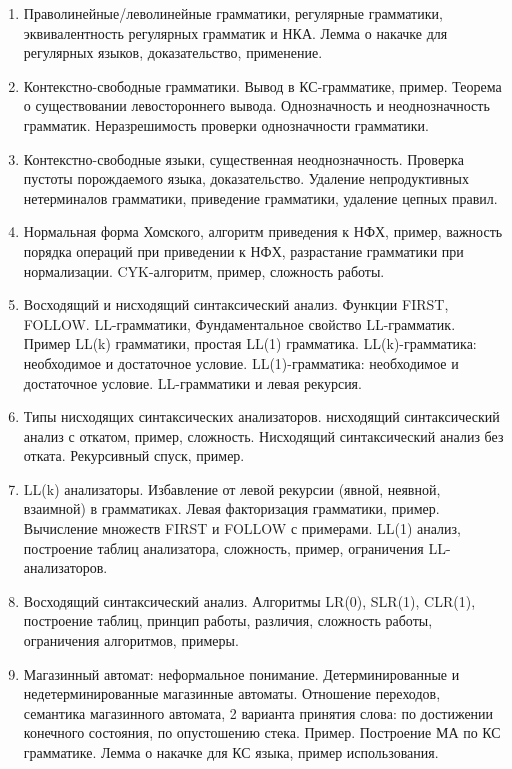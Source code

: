 \documentclass[12pt]{article}
\begin{document}
\begin{enumerate}
  \item {Праволинейные/леволинейные грамматики, регулярные грамматики, эквивалентность регулярных грамматик и НКА. Лемма о накачке для регулярных языков, доказательство, применение. }
  \item {Контекстно-свободные грамматики. Вывод в КС-грамматике, пример. Теорема о существовании левостороннего вывода. Однозначность и неоднозначность грамматик. Неразрешимость проверки однозначности грамматики. }
  \item {Контекстно-свободные языки, существенная неоднозначность. Проверка пустоты порождаемого языка, доказательство. Удаление непродуктивных нетерминалов грамматики, приведение грамматики, удаление цепных правил. }
  \item {Нормальная форма Хомского, алгоритм приведения к НФХ, пример, важность порядка операций при приведении к НФХ, разрастание грамматики при нормализации. CYK-алгоритм, пример, сложность работы. }
  \item {Восходящий и нисходящий синтаксический анализ. Функции FIRST, FOLLOW. LL-грамматики, Фундаментальное свойство LL-грамматик. Пример LL(k) грамматики, простая LL(1) грамматика. LL(k)-грамматика: необходимое и достаточное условие. LL(1)-грамматика: необходимое и достаточное условие. LL-грамматики и левая рекурсия.}
  \item {Типы нисходящих синтаксических анализаторов. нисходящий синтаксический анализ с откатом, пример, сложность. Нисходящий синтаксический анализ без отката. Рекурсивный спуск, пример. }
  \item {LL(k) анализаторы. Избавление от левой рекурсии (явной, неявной, взаимной) в грамматиках. Левая факторизация грамматики, пример. Вычисление множеств FIRST и FOLLOW с примерами. LL(1) анализ, построение таблиц анализатора, сложность, пример, ограничения LL-анализаторов. }
  \item {Восходящий синтаксический анализ. Алгоритмы LR(0), SLR(1), CLR(1), построение таблиц, принцип работы, различия, сложность работы, ограничения алгоритмов, примеры.}
  \item {Магазинный автомат: неформальное понимание. Детерминированные и недетерминированные магазинные автоматы. Отношение переходов, семантика магазинного автомата, 2 варианта принятия слова: по достижении конечного состояния, по опустошению стека. Пример. Построение МА по КС грамматике. Лемма о накачке для КС языка, пример использования. }
\end{enumerate}


\newpage
\end{document}
